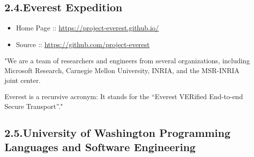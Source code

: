 \documentclass[12pt,twoside]{article}
\begin{document}
\subsection{2.4.\hspace*{0.5em}Everest Expedition}\label{sec-everest-expedition}%

\begin{itemize}[noitemsep,topsep=\mdcompacttopsep]%

\item{}Home Page :: \href{https://project-everest.github.io/}{{\ttfamily https://\hspace{0pt}project-\hspace{0pt}everest.\hspace{0pt}github.\hspace{0pt}io/\hspace{0pt}}}%

\item{}Source :: \href{https://github.com/project-everest}{{\ttfamily https://\hspace{0pt}github.\hspace{0pt}com/\hspace{0pt}project-\hspace{0pt}everest}}%
\end{itemize}%

\noindent{}"We are a team of researchers and engineers from several
organizations, including Microsoft Research, Carnegie Mellon
University, INRIA, and the MSR-INRIA joint center.%

Everest is a recursive acronym: It stands for the “Everest VERified
End-to-end Secure Transport”."%

\subsection{2.5.\hspace*{0.5em}University of Washington Programming Languages and Software Engineering}\label{sec-university-of-washington-programming-languages-and-software-engineering}%
\end{document}
